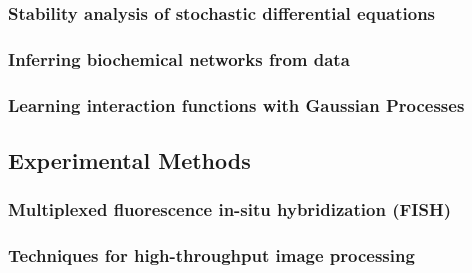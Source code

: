 \documentclass{article}
\begin{document}
\subsubsection{Stability analysis of stochastic differential equations}

\subsubsection{Inferring biochemical networks from data}

\subsubsection{Learning interaction functions with Gaussian Processes}

\subsection{Experimental Methods}

\subsubsection{Multiplexed fluorescence in-situ hybridization (FISH)}

\subsubsection{Techniques for high-throughput image processing}
\end{document}
